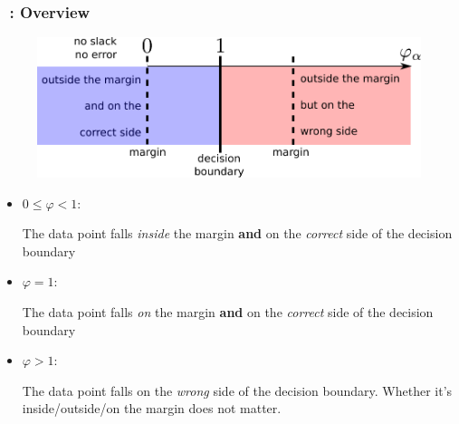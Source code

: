 \begin{frame}\frametitle{\subsubsecname~: Overview}

\begin{figure}[h]
	\centering
	\includegraphics[width=0.6\linewidth]{img/slack_values}%
    \label{fig:unconstrained}%
\end{figure}

\begin{itemize}
\item $0 \le \varphi < 1$:

The data point falls \emph{inside} the margin \textbf{and} on the \emph{correct} side of the decision boundary 


\item $\varphi = 1$:

The data point falls \emph{on} the margin \textbf{and} on the \emph{correct} side of the decision boundary 


\item $\varphi > 1$:

The data point falls on the \emph{wrong} side of the decision boundary. Whether it's inside/outside/on the margin does not matter.

\end{itemize}

\end{frame}

